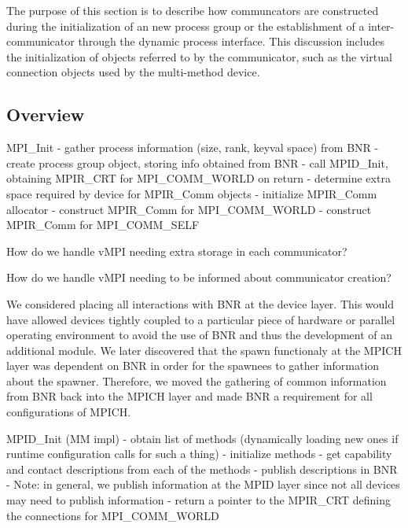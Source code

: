 The purpose of this section is to describe how communcators are constructed
during the initialization of an new process group or the establishment of a
inter-communicator through the dynamic process interface.  This discussion
includes the initialization of objects referred to by the communicator, such
as the virtual connection objects used by the multi-method device.


\subsection{Overview}

MPI_Init
- gather process information (size, rank, keyval space) from BNR
- create process group object, storing info obtained from BNR
- call MPID_Init, obtaining MPIR_CRT for MPI_COMM_WORLD on return
- determine extra space required by device for MPIR_Comm objects
- initialize MPIR_Comm allocator
- construct MPIR_Comm for MPI_COMM_WORLD
- construct MPIR_Comm for MPI_COMM_SELF

\Q How do we handle vMPI needing extra storage in each communicator?

\Q How do we handle vMPI needing to be informed about communicator creation?

\begin{discussion}
  We considered placing all interactions with BNR at the device layer.  This
  would have allowed devices tightly coupled to a particular piece of
  hardware or parallel operating environment to avoid the use of BNR and thus
  the development of an additional module.  We later discovered that the
  spawn functionaly at the MPICH layer was dependent on BNR in order for the
  spawnees to gather information about the spawner.  Therefore, we moved the
  gathering of common information from BNR back into the MPICH layer and made
  BNR a requirement for all configurations of MPICH.
\end{discussion}

MPID_Init (MM impl)
- obtain list of methods (dynamically loading new ones if runtime
  configuration calls for such a thing)
- initialize methods
- get capability and contact descriptions from each of the methods
- publish descriptions in BNR
  - Note: in general, we publish information at the MPID layer since not all
    devices may need to publish information
- return a pointer to the MPIR_CRT defining the connections for
  MPI_COMM_WORLD


